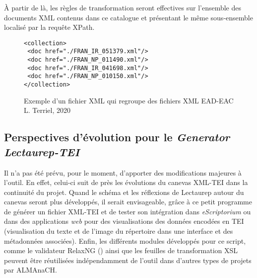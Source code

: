 À partir de là, les règles de transformation seront effectives sur l'ensemble des documents XML contenus dans ce catalogue et présentant le même sous-ensemble localisé par la requête XPath.

\begin{figure}[h!]
\lstset{language=XML}
\begin{lstlisting}
<collection>
 <doc href="./FRAN_IR_051379.xml"/>
 <doc href="./FRAN_NP_011490.xml"/>
 <doc href="./FRAN_IR_041698.xml"/>
 <doc href="./FRAN_NP_010150.xml"/>
</collection>
\end{lstlisting}
\caption{Exemple d'un fichier XML  qui regroupe des fichiers XML EAD-EAC  \textcopyright L. Terriel, 2020}
\label{fig:catalogue}
\end{figure}
\newpage
\subsection{Perspectives d'évolution pour le \textit{Generator Lectaurep-TEI}}

Il n'a pas été prévu, pour le moment, d'apporter des modifications majeures à l'outil. En effet, celui-ci suit de près les évolutions du canevas XML-TEI dans la continuité du projet. Quand le schéma et les réflexions de Lectaurep autour du canevas seront plus développés, il serait envisageable, grâce à ce petit programme de générer un fichier XML-TEI et de tester son intégration dans \textit{eScriptorium} ou dans des applications \textit{web} pour des visualisations des données encodées en TEI (visualisation du texte et de l'image du répertoire dans une interface et des métadonnées associées). Enfin, les différents modules développés pour ce script, comme le validateur RelaxNG () ainsi que les feuilles de transformation XSL peuvent être réutilisées indépendamment de l'outil dans d'autres types de projets par ALMAnaCH.
\clearpage
\thispagestyle{empty}